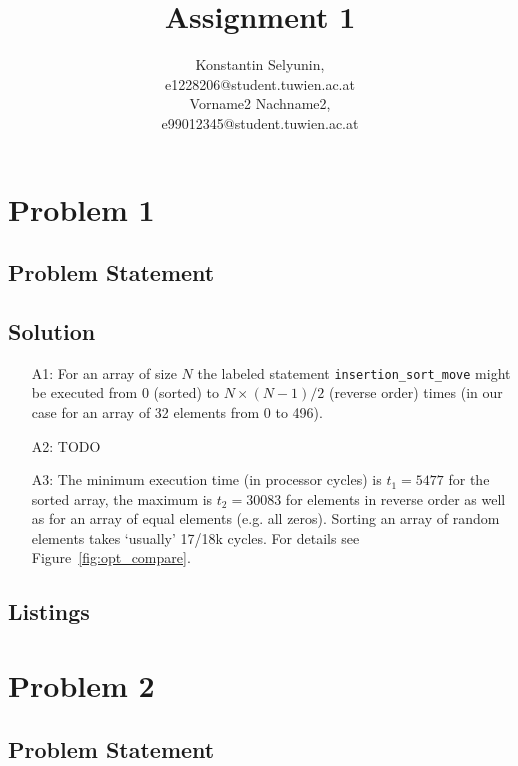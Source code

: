 \documentclass[12pt,a4paper,titlepage,oneside]{article}
\title{Assignment 1}
\author{Konstantin Selyunin, \matrnr 1228206   \\
         {\small e1228206@student.tuwien.ac.at} \\
        Vorname2 Nachname2, \matrnr 99012345 \\
         {\small e99012345@student.tuwien.ac.at}
}
\begin{document}
\maketitle


\section{Problem 1}

\subsection{Problem Statement}


\subsection{Solution}
\begin{itemize}
\item[A1:]
For an array of size $N$ the labeled statement
\texttt{insertion\_sort\_move} might be executed from $0$ (sorted) to
$N\times(N-1)/2$ (reverse order) times (in our case for an array of 32 
elements from 0 to 496). 

\item[A2:] 
  TODO
           
\item[A3:] 
The minimum execution time (in processor cycles) is $t_1 = 5477$
for the sorted array, the maximum is $t_2 = 30083$ for elements in
reverse order as well as for an array of equal elements (e.g. all
zeros). Sorting an array of random elements takes `usually' 17/18k cycles.
For details see Figure~\ref{fig:opt_compare}.

\end{itemize}

\subsection{Listings}

\newpage
\section{Problem 2}

\subsection{Problem Statement}

\end{document}
